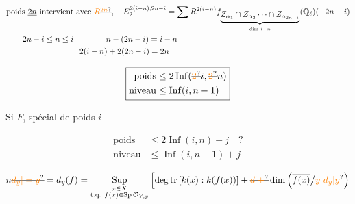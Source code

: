 
\[
\begin{aligned}
&\text{poids }\underline{2n}\ \text{intervient avec }\deleted{\unsure{R^{2n}}},\quad
E_2^{2(i-n),2n-i}=\sum R^{2(i-n)}f_{\underbrace{Z_{\alpha_1}\cap Z_{\alpha_2}\cdots\cap Z_{\alpha_{2n-i}}}_{\dim\,i-n}}(\mathbb Q_\ell)(-2n+i)\\
&\qquad 2n-i\leq n\leq i\qquad\qquad n-(2n-i)=i-n\\
&\hspace{9em}2(i-n)+2(2n-i)=2n
\end{aligned}
\]


\[ \boxed{\begin{aligned}\text{poids}&\leq 2\operatorname{Inf}(\deleted{\unsure{2}}i,\deleted{\unsure{2}}n)\\
\text{niveau}&\leq\operatorname{Inf}(i,n-1)\end{aligned}} \]

Si $F$,  spécial de poids $i$

\[ \begin{aligned}\text{poids}&\leq 2\operatorname{Inf}(i,n)+j\quad ?\\
\text{niveau}&\leq\operatorname{Inf}(i,n-1)+j\end{aligned} \]




\[ n\deleted{\unsure{d_y|=y}}=d_y(f)=\underset{\substack{x\in X\\\text{t.q. }f(x)\in\operatorname{Sp}\mathcal O_{Y,y}}}{\operatorname{Sup}}
\left[\deg \mathrm{tr}\,[k(x):k(f(x))]+{}\deleted{\unsure{d|{+}}}\dim\left(\overline{f(x)}\big/ \unsure{y\ d_y|y}\right)\right. \]

